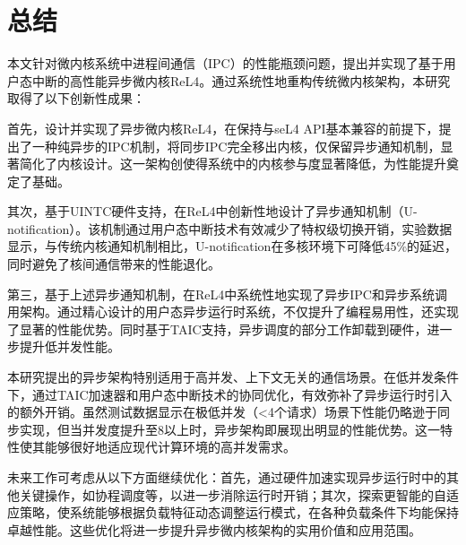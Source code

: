 \chapter{总结}
本文针对微内核系统中进程间通信（IPC）的性能瓶颈问题，提出并实现了基于用户态中断的高性能异步微内核ReL4。通过系统性地重构传统微内核架构，本研究取得了以下创新性成果：

首先，设计并实现了异步微内核ReL4，在保持与seL4 API基本兼容的前提下，提出了一种纯异步的IPC机制，将同步IPC完全移出内核，仅保留异步通知机制，显著简化了内核设计。这一架构创使得系统中的内核参与度显著降低，为性能提升奠定了基础。

其次，基于UINTC硬件支持，在ReL4中创新性地设计了异步通知机制（U-notification）。该机制通过用户态中断技术有效减少了特权级切换开销，实验数据显示，与传统内核通知机制相比，U-notification在多核环境下可降低45\%的延迟，同时避免了核间通信带来的性能退化。

第三，基于上述异步通知机制，在ReL4中系统性地实现了异步IPC和异步系统调用架构。通过精心设计的用户态异步运行时系统，不仅提升了编程易用性，还实现了显著的性能优势。同时基于TAIC支持，异步调度的部分工作卸载到硬件，进一步提升低并发性能。

本研究提出的异步架构特别适用于高并发、上下文无关的通信场景。在低并发条件下，通过TAIC加速器和用户态中断技术的协同优化，有效弥补了异步运行时引入的额外开销。虽然测试数据显示在极低并发（<4个请求）场景下性能仍略逊于同步实现，但当并发度提升至8以上时，异步架构即展现出明显的性能优势。这一特性使其能够很好地适应现代计算环境的高并发需求。

未来工作可考虑从以下方面继续优化：首先，通过硬件加速实现异步运行时中的其他关键操作，如协程调度等，以进一步消除运行时开销；其次，探索更智能的自适应策略，使系统能够根据负载特征动态调整运行模式，在各种负载条件下均能保持卓越性能。这些优化将进一步提升异步微内核架构的实用价值和应用范围。
